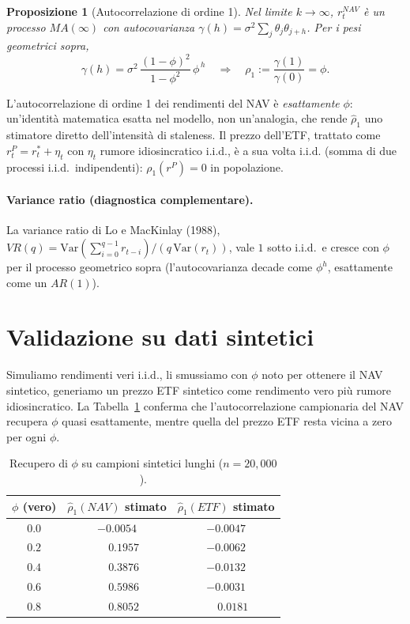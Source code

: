 \documentclass[11pt]{article}
\newtheorem{proposition}{Proposizione}
\begin{document}
\begin{proposition}[Autocorrelazione di ordine 1]
Nel limite $k\to\infty$, $r^{NAV}_t$ \`e un processo $MA(\infty)$ con autocovarianza $\gamma(h) = \sigma^2\sum_j\theta_j\theta_{j+h}$. Per i pesi geometrici sopra,
\[
\gamma(h) = \sigma^2\,\frac{(1-\phi)^2}{1-\phi^2}\,\phi^{\,h}
\quad\Longrightarrow\quad
\rho_1 := \frac{\gamma(1)}{\gamma(0)} = \phi.
\]
\end{proposition}

L'autocorrelazione di ordine 1 dei rendimenti del NAV \`e \emph{esattamente} $\phi$: un'identit\`a matematica esatta nel modello, non un'analogia, che rende $\hat\rho_1$ uno stimatore diretto dell'intensit\`a di staleness. Il prezzo dell'ETF, trattato come $r^P_t = r^\ast_t + \eta_t$ con $\eta_t$ rumore idiosincratico i.i.d., \`e a sua volta i.i.d. (somma di due processi i.i.d.\ indipendenti): $\rho_1(r^P)=0$ in popolazione.

\paragraph{Variance ratio (diagnostica complementare).} La variance ratio di Lo e MacKinlay (1988), $VR(q) = \mathrm{Var}(\sum_{i=0}^{q-1}r_{t-i}) / (q\,\mathrm{Var}(r_t))$, vale $1$ sotto i.i.d.\ e cresce con $\phi$ per il processo geometrico sopra (l'autocovarianza decade come $\phi^h$, esattamente come un $AR(1)$).

\section{Validazione su dati sintetici}

Simuliamo rendimenti veri i.i.d., li smussiamo con $\phi$ noto per ottenere il NAV sintetico, generiamo un prezzo ETF sintetico come rendimento vero pi\`u rumore idiosincratico. La Tabella~\ref{tab:validation} conferma che l'autocorrelazione campionaria del NAV recupera $\phi$ quasi esattamente, mentre quella del prezzo ETF resta vicina a zero per ogni $\phi$.

\begin{table}[H]
\centering
\caption{Recupero di $\phi$ su campioni sintetici lunghi ($n=20{,}000$).}
\label{tab:validation}
\begin{tabular}{ccc}
\toprule
$\phi$ (vero) & $\hat\rho_1(NAV)$ stimato & $\hat\rho_1(ETF)$ stimato \\
\midrule
$0.0$ & $-0.0054$ & $-0.0047$ \\
$0.2$ & $\phantom{-}0.1957$ & $-0.0062$ \\
$0.4$ & $\phantom{-}0.3876$ & $-0.0132$ \\
$0.6$ & $\phantom{-}0.5986$ & $-0.0031$ \\
$0.8$ & $\phantom{-}0.8052$ & $\phantom{-}0.0181$ \\
\bottomrule
\end{tabular}
\end{table}
\end{document}
